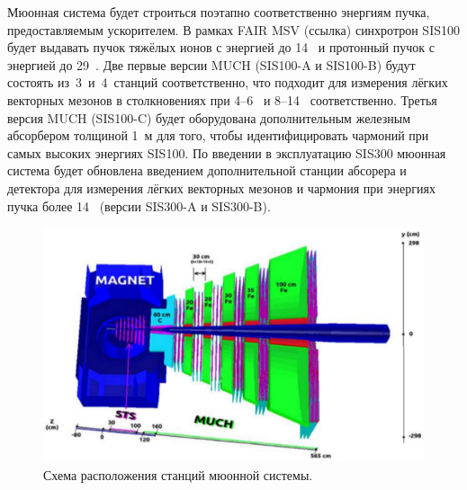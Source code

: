Мюонная система будет строиться поэтапно соответственно энергиям пучка, предоставляемым ускорителем. В рамках FAIR MSV (\todo ссылка) синхротрон SIS100 будет выдавать пучок тяжёлых ионов с энергией до 14~\GeVperNucl{} и протонный пучок с энергией до 29~\GeVperNucl{}. Две первые версии MUCH (SIS100-A и SIS100-B) будут состоять из~3~и~4~станций соответственно, что подходит для измерения лёгких векторных мезонов в столкновениях при 4--6~\GeVperNucl{} и 8--14~\GeVperNucl{} соответственно. Третья версия MUCH (SIS100-C) будет оборудована дополнительным железным абсорбером толщиной 1~м для того, чтобы идентифицировать чармоний при самых высоких энергиях SIS100.
По введении в эксплуатацию SIS300 мюонная система будет обновлена введением дополнительной станции абсорера и детектора для измерения лёгких векторных мезонов и чармония при энергиях пучка более 14~\GeVperNucl{} (версии SIS300-A и SIS300-B).


\begin{figure}[H]
\includegraphics[width=1.0\textwidth]{pictures/MUCH.png}
\caption{Схема расположения станций мюонной системы.}
\label{fig:MUCH}
\end{figure}




